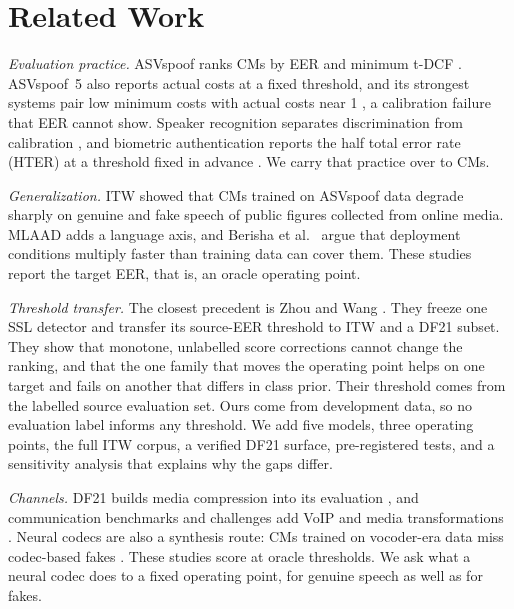 \documentclass[conference]{IEEEtran}
\begin{document}
\section{Related Work}
\label{sec:related}
\emph{Evaluation practice.} ASVspoof ranks CMs by EER and minimum t-DCF
\cite{wang20_asvspoof2019,liu23_asvspoof2021,kinnunen18_tdcf}. ASVspoof~5 also
reports actual costs at a fixed threshold, and its strongest systems pair low
minimum costs with actual costs near 1 \cite{wang24_asvspoof5}, a calibration
failure that EER cannot show. Speaker recognition separates discrimination from
calibration \cite{brummer06_calibration}, and biometric authentication reports
the half total error rate (HTER) at a threshold fixed in advance
\cite{bengio04_hter}. We carry that practice over to CMs.

\emph{Generalization.} ITW \cite{muller22_in_the_wild} showed that CMs trained
on ASVspoof data degrade sharply on genuine and fake speech of public figures
collected from online media. MLAAD \cite{mlaad24} adds a language axis, and
Berisha et al.\ \cite{berisha25_coverage_debt} argue that deployment conditions
multiply faster than training data can cover them. These studies report the
target EER, that is, an oracle operating point.

\emph{Threshold transfer.} The closest precedent is Zhou and Wang
\cite{zhou26_eer_hides}. They freeze one SSL detector and transfer its
source-EER threshold to ITW and a DF21 subset. They show that monotone,
unlabelled score corrections cannot change the ranking, and that the one family
that moves the operating point helps on one target and fails on another that
differs in class prior. Their threshold comes from the labelled source
evaluation set. Ours come from development data, so no evaluation label
informs any threshold. We add five models, three operating points, the full ITW
corpus, a verified DF21 surface, pre-registered tests, and a sensitivity
analysis that explains why the gaps differ.

\emph{Channels.} DF21 builds media compression into its evaluation
\cite{liu23_asvspoof2021}, and communication benchmarks and challenges add
VoIP and media transformations \cite{realworld_comms24,radar26}. Neural codecs
are also a synthesis route: CMs trained on vocoder-era data miss codec-based
fakes \cite{wu24_codecfake}. These studies score at oracle thresholds. We ask
what a neural codec does to a fixed operating point, for genuine speech as well
as for fakes.
\end{document}
